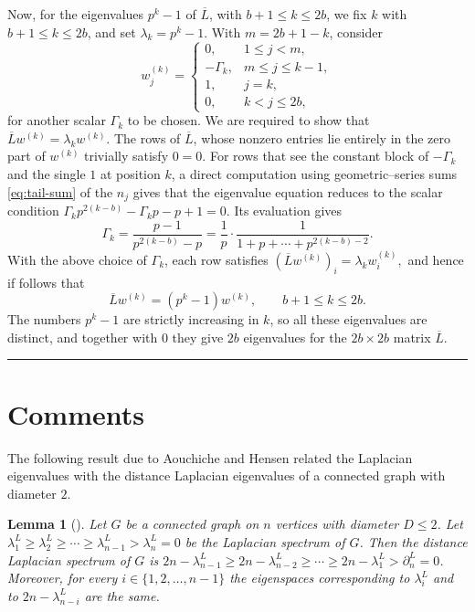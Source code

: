 \documentclass[12pt,twoside]{article}
\renewenvironment{proof}{{\noindent\bfseries Proof.}}{\qed}
\newtheorem{lemma}[theorem]{Lemma}
\def\qed{\nolinebreak\hfill\rule{.2cm}{.2cm}\par\addvspace{.5cm}}
\begin{document}
\begin{proof}
	Now, for the eigenvalues $p^{k}-1$ of $\overline{L}$, with $b+1\le k\le 2b$, we fix $k$ with $b+1\le k\le 2b$, and set $\lambda_k=p^k-1$. With $m=2b+1-k$, consider
	\begin{equation}\label{eq:w-k-def}
		w^{(k)}_j =
		\begin{cases}
			0,          & 1\le j < m,\\
			- \varGamma_k,  & m\le j \le k-1,\\
			1,          & j=k,\\
			0,          & k<j\le 2b,
		\end{cases}
	\end{equation}
	for another scalar $ \varGamma_k$ to be chosen. We are required to show that $\overline{L} w^{(k)} = \lambda_k w^{(k)}.$ The rows of $\overline{L}$, whose nonzero entries lie entirely in the zero part of $w^{(k)}$ trivially satisfy $0=0$. For rows that see the constant block of $- \varGamma_k$ and the single $1$ at position $k$, a direct computation using geometric–series sums \eqref{eq:tail-sum} of the $n_j$ gives that the eigenvalue equation reduces to the scalar condition $ \varGamma_k p^{ 2(k-b)} -  \varGamma_k p - p + 1 = 0.$ Its evaluation gives
	\begin{equation}\label{eq:gamma-k-large}
		 \varGamma_k = \frac{p-1}{p^{2(k-b)}-p}
		= \frac1p\cdot\frac{1}{1+p+\cdots+p^{2(k-b)-2}}.
	\end{equation}
	With the above choice of $ \varGamma_k$, each row satisfies $(\overline{L}w^{(k)})_i = \lambda_k w^{(k)}_i,$ and 
	hence if follows that
	\[
	\overline{L}w^{(k)} = (p^k-1)w^{(k)},\qquad b+1\le k\le 2b.
	\]
	The numbers $p^k-1$ are strictly increasing in $k$, so all these eigenvalues are distinct, and together with $0$ they give $2b$ eigenvalues for the $2b\times 2b$ matrix $\overline{L}$.
\end{proof}

\section{Comments}
The following result due to Aouchiche and Hensen related the Laplacian eigenvalues  with the distance Laplacian eigenvalues of a connected graph with diameter $2.$
\begin{lemma}[\cite{Ah2013}]\label{ah lemma}
	Let $G$ be a connected graph on $n$ vertices with diameter $D \leq 2$. Let $\lambda^L_1 \geq \lambda^L_2 \geq \cdots \geq \lambda^L_{n-1} > \lambda^L_n = 0$ be the Laplacian spectrum of $G$. Then the distance Laplacian spectrum of $G$ is $2n - \lambda^L_{n-1} \geq 2n - \lambda^L_{n-2} \geq \cdots \geq 2n - \lambda^L_1 > \partial^L_n = 0$. Moreover, for every $i \in \{1, 2, \ldots, n-1\}$ the eigenspaces corresponding to $\lambda^L_i$ and to $2n - \lambda^L_{n-i}$ are the same.
\end{lemma}
	
\end{document}
